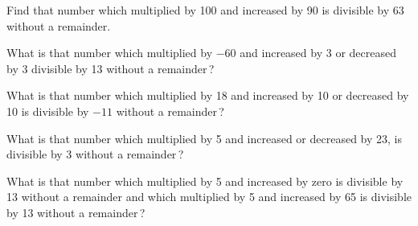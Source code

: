 \documentclass[]{article}
\begin{document}
{\begin{quote}  {
}  \end{quote}

{Find that number which multiplied by 100 and increased by 90 is
divisible by 63 without a remainder.}

\begin{quote}  {
}  \end{quote}

{What is that number which multiplied by $-60$ and increased by 3 or
decreased by 3 divisible by 13 without a remainder\,?}

\begin{quote}  {
}  \end{quote}

{What is that number which multiplied by 18 and increased by 10 or
decreased by 10 is divisible by $-11$ without a remainder\,?}

\newpage
\large

\begin{quote}  {
}  \end{quote}

{What is that number which multiplied by 5 and increased or decreased by
23, is divisible by 3 without a remainder\,?}

\begin{quote}  {
}  \end{quote}

{What is that number which multiplied by 5 and increased by zero is
divisible by 13 without a remainder and which multiplied by 5 and
increased by 65 is divisible by 13 without a remainder\,?}

}
\end{document}
